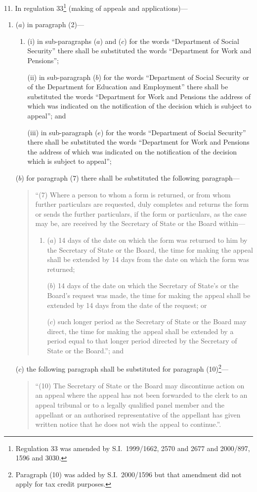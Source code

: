 \documentclass[12pt,a4paper]{article}
\begin{document}
11.  In regulation 33\footnote{Regulation 33 was amended by S.I.\ 1999/1662, 2570 and 2677 and 2000/897, 1596 and 3030.} (making of appeals and applications)—
\begin{enumerate}\item[]
($a$) in paragraph (2)—
\begin{enumerate}\item[]
(i) in sub-paragraphs ($a$)  and ($c$)  for the words “Department of Social Security” there shall be substituted the words “Department for Work and Pensions”;

(ii) in sub-paragraph ($b$)  for the words “Department of Social Security or of the Department for Education and Employment” there shall be substituted the words “Department for Work and Pensions the address of which was indicated on the notification of the decision which is subject to appeal”; and

(iii) in sub-paragraph ($e$)  for the words “Department of Social Security” there shall be substituted the words “Department for Work and Pensions the address of which was indicated on the notification of the decision which is subject to appeal”;
\end{enumerate}

($b$) for paragraph (7) there shall be substituted the following paragraph—
\begin{quotation}
“(7) Where a person to whom a form is returned, or from whom further particulars are requested, duly completes and returns the form or sends the further particulars, if the form or particulars, as the case may be, are received by the Secretary of State or the Board within—
\begin{enumerate}\item[]
($a$) 14 days of the date on which the form was returned to him by the Secretary of State or the Board, the time for making the appeal shall be extended by 14 days from the date on which the form was returned;

($b$) 14 days of the date on which the Secretary of State’s or the Board’s request was made, the time for making the appeal shall be extended by 14 days from the date of the request; or

($c$) such longer period as the Secretary of State or the Board may direct, the time for making the appeal shall be extended by a period equal to that longer period directed by the Secretary of State or the Board.”; and
\end{enumerate}
\end{quotation}

($c$) the following paragraph shall be substituted for paragraph (10)\footnote{Paragraph (10) was added by S.I.\ 2000/1596 but that amendment did not apply for tax credit purposes. }—
\begin{quotation}
“(10) The Secretary of State or the Board may discontinue action on an appeal where the appeal has not been forwarded to the clerk to an appeal tribunal or to a legally qualified panel member and the appellant or an authorised representative of the appellant has given written notice that he does not wish the appeal to continue.”.
\end{quotation}
\end{enumerate}
\end{document}

